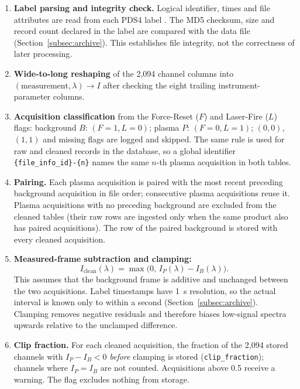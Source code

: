 \documentclass[final,5p,twocolumn,a4paper]{elsarticle}
\begin{document}
\begin{enumerate}
    \item \textbf{Label parsing and integrity check.} Logical identifier, times and file attributes are read from each PDS4 label \cite{pds4_standard}. The MD5 checksum, size and record count declared in the label are compared with the data file (Section~\ref{subsec:archive}). This establishes file integrity, not the correctness of later processing.
    \item \textbf{Wide-to-long reshaping} of the 2,094 channel columns into $(\text{measurement},\lambda)\rightarrow I$ after checking the eight trailing instrument-parameter columns.
    \item \textbf{Acquisition classification} from the Force-Reset ($F$) and Laser-Fire ($L$) flags: background $B$: $(F{=}1,L{=}0)$; plasma $P$: $(F{=}0,L{=}1)$; $(0,0)$, $(1,1)$ and missing flags are logged and skipped. The same rule is used for raw and cleaned records in the database, so a global identifier \texttt{\{file\_info\_id\}-\{n\}} names the same $n$-th plasma acquisition in both tables.
    \item \textbf{Pairing.} Each plasma acquisition is paired with the most recent preceding background acquisition in file order; consecutive plasma acquisitions reuse it. Plasma acquisitions with no preceding background are excluded from the cleaned tables (their raw rows are ingested only when the same product also has paired acquisitions). The row of the paired background is stored with every cleaned acquisition.
    \item \textbf{Measured-frame subtraction and clamping:}
    \begin{equation}
        \label{eq:clamping}
        I_{\mathrm{clean}}(\lambda) = \max\bigl(0,\, I_{P}(\lambda) - I_{B}(\lambda)\bigr).
    \end{equation}
    This assumes that the background frame is additive and unchanged between the two acquisitions. Label timestamps have 1~s resolution, so the actual interval is known only to within a second (Section~\ref{subsec:archive}). Clamping removes negative residuals and therefore biases low-signal spectra upwards relative to the unclamped difference.
    \item \textbf{Clip fraction.} For each cleaned acquisition, the fraction of the 2,094 stored channels with $I_P - I_B < 0$ \emph{before} clamping is stored (\texttt{clip\_fraction}); channels where $I_P = I_B$ are not counted. Acquisitions above 0.5 receive a warning. The flag excludes nothing from storage.
\end{enumerate}
\end{document}
